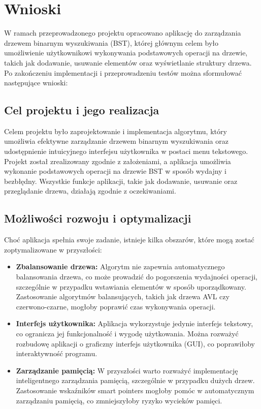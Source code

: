 \newpage
\section{Wnioski}

W ramach przeprowadzonego projektu opracowano aplikację do zarządzania drzewem binarnym wyszukiwania (BST), której głównym celem było umożliwienie użytkownikowi wykonywania podstawowych operacji na drzewie, takich jak dodawanie, usuwanie elementów oraz wyświetlanie struktury drzewa. Po zakończeniu implementacji i przeprowadzeniu testów można sformułować następujące wnioski:

\subsection{Cel projektu i jego realizacja}

Celem projektu było zaprojektowanie i implementacja algorytmu, który umożliwia efektywne zarządzanie drzewem binarnym wyszukiwania oraz udostępnienie intuicyjnego interfejsu użytkownika w postaci menu tekstowego. Projekt został zrealizowany zgodnie z założeniami, a aplikacja umożliwia wykonanie podstawowych operacji na drzewie BST w sposób wydajny i bezbłędny. Wszystkie funkcje aplikacji, takie jak dodawanie, usuwanie oraz przeglądanie drzewa, działają zgodnie z oczekiwaniami.

\subsection{Możliwości rozwoju i optymalizacji}

Choć aplikacja spełnia swoje zadanie, istnieje kilka obszarów, które mogą zostać zoptymalizowane w przyszłości:

\begin{itemize}
	\item \textbf{Zbalansowanie drzewa:} Algorytm nie zapewnia automatycznego balansowania drzewa, co może prowadzić do pogorszenia wydajności operacji, szczególnie w przypadku wstawiania elementów w sposób uporządkowany. Zastosowanie algorytmów balansujących, takich jak drzewa AVL czy czerwono-czarne, mogłoby poprawić czas wykonywania operacji.
	\item \textbf{Interfejs użytkownika:} Aplikacja wykorzystuje jedynie interfejs tekstowy, co ogranicza jej funkcjonalność i wygodę użytkowania. Można rozważyć rozbudowę aplikacji o graficzny interfejs użytkownika (GUI), co poprawiłoby interaktywność programu.
	\item \textbf{Zarządzanie pamięcią:} W przyszłości warto rozważyć implementację inteligentnego zarządzania pamięcią, szczególnie w przypadku dużych drzew. Zastosowanie wskaźników smart pointers mogłoby pomóc w automatycznym zarządzaniu pamięcią, co zmniejszyłoby ryzyko wycieków pamięci.
\end{itemize}

